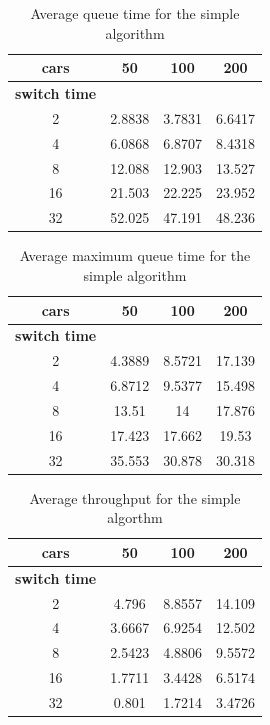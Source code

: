 \documentclass[a4paper,11pt]{article}
\begin{document}
\begin{table}[htb]
\centering
\begin{tabular}{cccc}
\hline
\textbf{cars} & 50 & 100 & 200\\
\hline
\textbf{switch time} & & & \\
2 & 2.8838 & 3.7831 & 6.6417 \\
4 & 6.0868 & 6.8707 & 8.4318 \\
8 & 12.088 & 12.903 & 13.527 \\
16 & 21.503 & 22.225 & 23.952 \\
32 & 52.025 & 47.191 & 48.236 \\
\hline
\end{tabular}
\label{tab:simpleavgtime}
\caption{Average queue time for the simple algorithm}
\end{table}

\begin{table}[htb]
\centering
\begin{tabular}{cccc}
\hline
\textbf{cars} & 50 & 100 & 200\\
\hline
\textbf{switch time} & & & \\
2 & 4.3889 & 8.5721 & 17.139 \\
4 & 6.8712 & 9.5377 & 15.498 \\
8 & 13.51 & 14 & 17.876 \\
16 & 17.423 & 17.662 & 19.53 \\
32 & 35.553 & 30.878 & 30.318 \\
\hline
\end{tabular}
\label{tab:simplemaxtime}
\caption{Average maximum queue time for the simple algorithm}
\end{table}

\begin{table}[htb]
\centering
\begin{tabular}{cccc}
\hline
\textbf{cars} & 50 & 100 & 200\\
\hline
\textbf{switch time} & & & \\
2 & 4.796 & 8.8557 & 14.109 \\
4 & 3.6667 & 6.9254 & 12.502 \\
8 & 2.5423 & 4.8806 & 9.5572 \\
16 & 1.7711 & 3.4428 & 6.5174 \\
32 & 0.801 & 1.7214 & 3.4726 \\
\hline
\end{tabular}
\label{tab:simplecars}
\caption{Average throughput for the simple algorthm}
\end{table}
\end{document}
